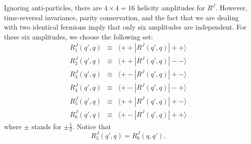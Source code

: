 Ignoring anti-particles, there are $4\times 4 = 16$
 helicity amplitudes for ${R}^J$. However,
time-reversal invariance, parity conservation, and the fact that we are 
dealing with two identical fermions imply that 
only six amplitudes are independent. For these six amplitudes, we 
choose the following set:
\begin{eqnarray}
{R}^J_1(q',q)&\equiv& \langle ++|{R}^J(q',q)|++ \rangle \nonumber \\
{R}^J_2(q',q)&\equiv& \langle ++|{R}^J(q',q)|-- \rangle \nonumber \\
{R}^J_3(q',q)&\equiv& \langle +-|{R}^J(q',q)|+- \rangle \nonumber \\
{R}^J_4(q',q)&\equiv& \langle +-|{R}^J(q',q)|-+ \rangle  \\
\label{22.2}
{R}^J_5(q',q)&\equiv& \langle ++|{R}^J(q',q)|+- \rangle \nonumber \\
{R}^J_6(q',q)&\equiv& \langle +-|{R}^J(q',q)|++ \rangle \nonumber
\end{eqnarray}
where $\pm$ stands for $\pm \frac12$.
Notice that
\begin{equation}
{R}^J_5(q',q)={R}^J_6(q,q') .
\label{22.3}
\end{equation}

